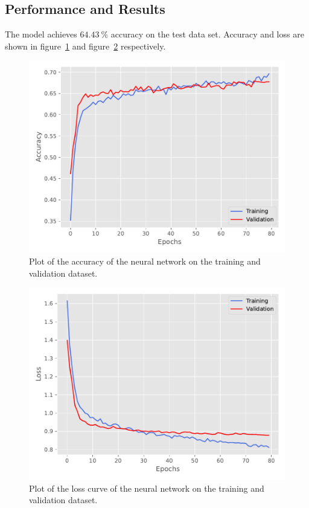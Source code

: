 \documentclass[
  12pt,
  bibliography=totoc,     %
  captions=tableheading,  %
  titlepage=firstiscover, %
]{scrartcl}
\begin{document}
\subsection{Performance and Results}
The model achieves $\SI{64.43}{\percent}$ accuracy on the test data set. Accuracy and loss are shown in figure~\ref{fig:nn_acc} and figure~\ref{fig:nn_loss} respectively.
\begin{figure}[H]
  \centering
  \includegraphics[scale=0.56]{figures/NN/Acc.pdf}
  \caption{Plot of the accuracy of the neural network on the training and validation dataset.}
  \label{fig:nn_acc}
\end{figure}
\begin{figure}[ht]
  \centering
  \includegraphics[scale=0.56]{figures/NN/Loss.pdf}
  \caption{Plot of the loss curve of the neural network on the training and validation dataset.}
  \label{fig:nn_loss}
\end{figure}
\end{document}
